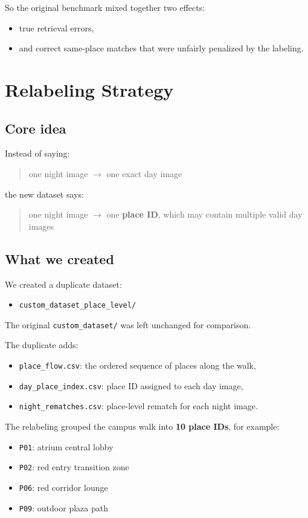 \documentclass[11pt]{article}
\newcommand{\file}[1]{\texttt{#1}}
\newcommand{\code}[1]{\texttt{#1}}
\begin{document}
So the original benchmark mixed together two effects:
\begin{itemize}[leftmargin=*]
  \item true retrieval errors,
  \item and correct same-place matches that were unfairly penalized by the labeling.
\end{itemize}

\section{Relabeling Strategy}
\subsection*{Core idea}
Instead of saying:
\begin{quote}
one night image $\rightarrow$ one exact day image
\end{quote}
the new dataset says:
\begin{quote}
one night image $\rightarrow$ one \textbf{place ID}, which may contain multiple valid day images
\end{quote}

\subsection*{What we created}
We created a duplicate dataset:
\begin{itemize}[leftmargin=*]
  \item \file{custom\_dataset\_place\_level/}
\end{itemize}

The original \file{custom\_dataset/} was left unchanged for comparison.

The duplicate adds:
\begin{itemize}[leftmargin=*]
  \item \file{place\_flow.csv}: the ordered sequence of places along the walk,
  \item \file{day\_place\_index.csv}: place ID assigned to each day image,
  \item \file{night\_rematches.csv}: place-level rematch for each night image.
\end{itemize}

The relabeling grouped the campus walk into \textbf{10 place IDs}, for example:
\begin{itemize}[leftmargin=*]
  \item \code{P01}: atrium central lobby
  \item \code{P02}: red entry transition zone
  \item \code{P06}: red corridor lounge
  \item \code{P09}: outdoor plaza path
\end{itemize}
\end{document}
